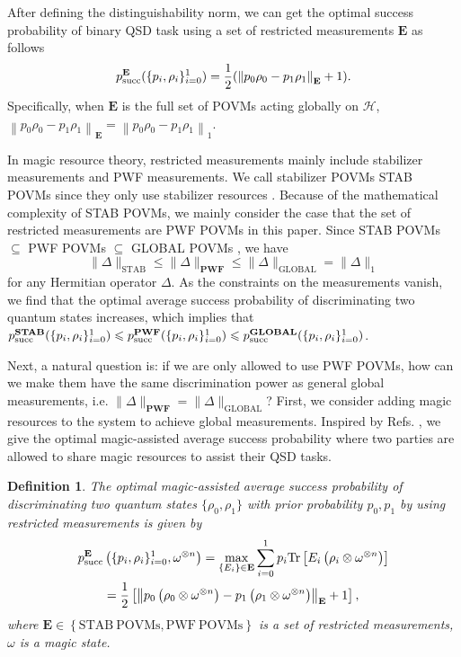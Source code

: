 \documentclass[aps,pra,twocolumn,floatfix,amsfonts,10pt]{revtex4-2}
\newtheorem{definition}{Definition}
\begin{document}
After defining the distinguishability norm, we can get the optimal success probability of binary QSD task using a set of restricted measurements $\mathbf{E}$ as follows
\begin{equation}
	p_{\rm{succ}}^{\mathbf{E}}(\{p_i,\rho_i\}_{i=0}^1) = \frac{1}{2}( \left\|p_0\rho_0-p_1\rho_1 \right\|_{\mathbf{E}}+1 ).
\end{equation}
Specifically, when $\mathbf{E}$ is the full set of POVMs acting globally on $\mathcal{H}$, $\left\|p_0\rho_0-p_1\rho_1 \right\|_{\mathbf{E}} = \left\|p_0\rho_0-p_1\rho_1 \right\|_1$.

In magic resource theory, restricted measurements mainly include stabilizer measurements and PWF measurements.
We call stabilizer POVMs STAB POVMs since they only use stabilizer resources \cite{MLF+2025}.
Because of the mathematical complexity of STAB POVMs, we mainly consider the case that the set of restricted measurements are PWF POVMs in this paper.
Since STAB POVMs $\subseteq$ PWF POVMs $\subseteq$ GLOBAL POVMs \cite{ZLZ+2024}, we have
\begin{equation}
	\|\Delta\|_{\mathrm{STAB}} \leqslant \|\Delta\|_{\mathbf{PWF}} \leqslant \|\Delta\|_{\mathrm{GLOBAL}} = \|\Delta\|_1
\end{equation}
for any Hermitian operator $\Delta$.
As the constraints on the measurements vanish, we find that the optimal average success probability of discriminating two quantum states increases, which implies that $p_{\rm{succ}}^{\mathbf{STAB}}(\{p_i,\rho_i\}_{i=0}^1) \leqslant p_{\rm{succ}}^{\mathbf{PWF}}(\{p_i,\rho_i\}_{i=0}^1) \leqslant p_{\rm{succ}}^{\mathbf{GLOBAL}}(\{p_i,\rho_i\}_{i=0}^1)$.

Next, a natural question is: if we are only allowed to use PWF POVMs, how can we make them have the same discrimination power as general global measurements, i.e. $\|\Delta\|_{\mathbf{PWF}} = \|\Delta\|_{\mathrm{GLOBAL}}$?
First, we consider adding magic resources to the system to achieve global measurements. 
Inspired by Refs. \cite{ZZL+2025,WL2026}, we give the optimal magic-assisted average success probability where two parties are allowed to share magic resources to assist their QSD tasks.
\begin{definition}
	The optimal magic-assisted average success probability of discriminating two quantum states $\{\rho_0,\rho_1\}$ with prior probability $p_0,p_1$ by using restricted measurements is given by
	\begin{equation}\label{Magic-assisted QSD}
		\begin{aligned}
			p_{\rm{succ}}^{\mathbf{E}}&\left(\{p_i,\rho_i\}_{i=0}^1, \omega^{\otimes n} \right) = \max_{\{E_i\}\in\mathbf{E}}\displaystyle\sum_{i=0}^{1}p_i\mathrm{Tr}\left[E_i\left(\rho_i\otimes \omega^{\otimes n}\right)\right] \\ &= \frac{1}{2}\left[\left\|p_0\left(\rho_0 \otimes \omega^{\otimes n}\right)-p_1\left(\rho_1 \otimes \omega^{\otimes n} \right) \right\|_{\mathbf{E}}+1 \right],
		\end{aligned}
	\end{equation}
	where $\mathbf{E} \in \left\{\mathrm{STAB~POVMs}, \mathrm{PWF~POVMs} \right\}$ is a set of restricted measurements, $\omega$ is a magic state.
\end{definition}
\end{document}
